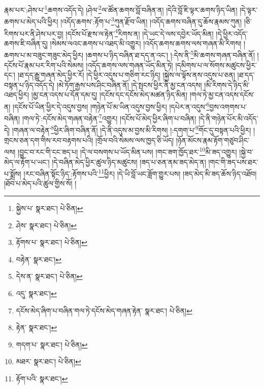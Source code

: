 རྣམ་པར་:ཤེས་པ་\footnote{སྐྱེས་པ་  སྣར་ཐང་།  པེ་ཅིན། }ཆགས་འདོད་དེ། །ཤེལ་\footnote{ཤེས་  སྣར་ཐང་།  པེ་ཅིན། }ལ་ཚོན་ཆགས་བློ་བཞིན་ན། །དེའི་བློ་ཇི་ལྟར་ཆགས་ཉིད་ཡིན། །དེ་ལྟར་ཆགས་པ་མེད་པའི་ཕྱིར། །འདོད་ཆགས་:རྟོག་པ་\footnote{རྟོགས་པ་  སྣར་ཐང་།  པེ་ཅིན། }ཀུན་རྫོབ་ཡིན། །འདོད་ཆགས་བཞིན་དུ་ཆོས་རྣམས་ཀུན། །ཅི་རིགས་པར་ནི་ཤེས་པར་བྱ། །དངོས་པོ་རྫས་ལ་རྟེན་\footnote{བརྟེན་  སྣར་ཐང་། }རིགས་ན། །དེ་ཡང་དེ་ལས་དབྱེར་ཡོད་མིན། །དེ་ཕྱིར་འདོད་ཆགས་ཇི་བཞིན་དུ། །སེམས་ལའང་ཆགས་པ་འཐད་མི་འགྱུར། །འདོད་ཆགས་ཆགས་ལས་གཞན་མི་རིགས། །ཆགས་པ་མ་བཟུང་གཟུང་མེད་ཕྱིར། །ཆགས་པ་ཉིད་བཞིན་ཐ་དད་ན་འང་། །:དེས་ནི་\footnote{དེས་ན་  སྣར་ཐང་།  པེ་ཅིན། }མི་ཆགས་གཞན་བཞིན་ནོ། །དངོས་པོ་རྣམ་པར་རིག་པའི་སེམས། །འདོད་ཆགས་ལས་གཞན་ཡོད་མིན་ཏེ། །དམིགས་པ་ལ་སོགས་མཚུངས་ཕྱིར་དང་། །ཐ་དད་རྒྱུ་གཞན་མེད་ཕྱིར་རོ། །དེ་ཕྱིར་འདུས་པ་གཅིག་རང་ཉིད། །སྐྱེས་ལ་ལྟོས་ནས་འདུས་པ་ཅན། །ཐ་དད་བསྟན་པ་ཉིད་འདོད་དེ། །མེ་ཏོག་རྒྱས་པས་ཤིང་བཞིན་ནོ། །དེ་སྤངས་ཕྱིར་ནི་མྱ་ངན་འདས། །མི་རིགས་དེ་ཉིད་མི་འཐད་ཕྱིར། །མྱ་ངན་འདས་པ་དོན་དམ་དུ། །དངོས་དང་དངོས་མེད་མཚན་ཉིད་མིན། །གལ་ཏེ་མྱ་ངན་འདས་དངོས་ན། །དངོས་པོ་ཡིན་ཕྱིར་དེ་འདུས་བྱས། །གཉེན་པོ་མ་ཡིན་འདུས་བྱས་ཕྱིར། །དཔེར་ན་འདུས་\footnote{འདུ་  སྣར་ཐང་། }བྱས་འགགས་པ་བཞིན། །གལ་ཏེ་:དངོས་མེད་གཞན་བརྟེན་\footnote{དངོས་མེད་ཞིག་པ་བཞིན་གལ་ཏེ་དངོས་མེད་གཞན་རྟེན་  སྣར་ཐང་།  པེ་ཅིན། }འགྱུར། །དངོས་པོ་མེད་ཕྱིར་ཞིག་པ་བཞིན། །དེ་ནི་གཉེན་པོར་མི་འདོད་དེ། །གཞན་ལ་བརྟེན་\footnote{རྟེན་  སྣར་ཐང་། }ཕྱིར་ཞིག་བཞིན་ནོ། །དེ་ནི་འདུས་མ་བྱས་མི་རིགས། །:དགག་པ་\footnote{གདག་པ་  སྣར་ཐང་།  པེ་ཅིན། }གོང་དུ་བསྟན་པའི་ཕྱིར། །གྲངས་ཅན་དག་གིས་རབ་བརྟགས་པའི། །གྲོལ་བའི་སེམས་ལས་ཁྱད་ཅི་ཡོད། །ཉོན་མོངས་རྣམ་རྟོག་གཙུབ་ཤིང་ལས། །བྱུང་བ་རང་གི་ངང་ཟད་པ། །དེ་ལ་བསགས་པ་ཡོད་མིན་པས། །གང་ཟག་ཁྱོད་ཐར་\footnote{མཐར་  སྣར་ཐང་།  པེ་ཅིན། }མི་ཟད་འགྱུར། །སྐྱེ་བ་མེད་ལ་རྟོག་པ་ཡང་། །དེ་བཞིན་མེད་ཕྱིར་ཚུལ་ཉིད་མཚུངས། །ཟད་པ་ཅན་ནམ་ཟད་མེད་ན། །གང་གི་ཟད་པས་ཐར་པ་སྨྲོས། །རང་བཞིན་སྟོང་ཉིད་:རྟོགས་པའི་\footnote{རྟོག་པའི་  སྣར་ཐང་། }ཕྱིར། །དེ་ཡི་བློ་ཡང་ཟློག་གྱུར་པས། །ཟད་མེད་མི་ཟད་ཆོས་ཉིད་འཐོབ། །ཐོབ་པ་མེད་པའི་ཚུལ་གྱིས་སོ། །

